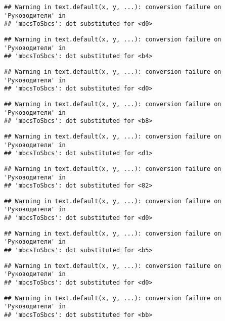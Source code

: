 \documentclass[
]{article}
\begin{document}
\begin{verbatim}
## Warning in text.default(x, y, ...): conversion failure on 'Руководители' in
## 'mbcsToSbcs': dot substituted for <d0>
\end{verbatim}

\begin{verbatim}
## Warning in text.default(x, y, ...): conversion failure on 'Руководители' in
## 'mbcsToSbcs': dot substituted for <b4>
\end{verbatim}

\begin{verbatim}
## Warning in text.default(x, y, ...): conversion failure on 'Руководители' in
## 'mbcsToSbcs': dot substituted for <d0>
\end{verbatim}

\begin{verbatim}
## Warning in text.default(x, y, ...): conversion failure on 'Руководители' in
## 'mbcsToSbcs': dot substituted for <b8>
\end{verbatim}

\begin{verbatim}
## Warning in text.default(x, y, ...): conversion failure on 'Руководители' in
## 'mbcsToSbcs': dot substituted for <d1>
\end{verbatim}

\begin{verbatim}
## Warning in text.default(x, y, ...): conversion failure on 'Руководители' in
## 'mbcsToSbcs': dot substituted for <82>
\end{verbatim}

\begin{verbatim}
## Warning in text.default(x, y, ...): conversion failure on 'Руководители' in
## 'mbcsToSbcs': dot substituted for <d0>
\end{verbatim}

\begin{verbatim}
## Warning in text.default(x, y, ...): conversion failure on 'Руководители' in
## 'mbcsToSbcs': dot substituted for <b5>
\end{verbatim}

\begin{verbatim}
## Warning in text.default(x, y, ...): conversion failure on 'Руководители' in
## 'mbcsToSbcs': dot substituted for <d0>
\end{verbatim}

\begin{verbatim}
## Warning in text.default(x, y, ...): conversion failure on 'Руководители' in
## 'mbcsToSbcs': dot substituted for <bb>
\end{verbatim}
\end{document}
